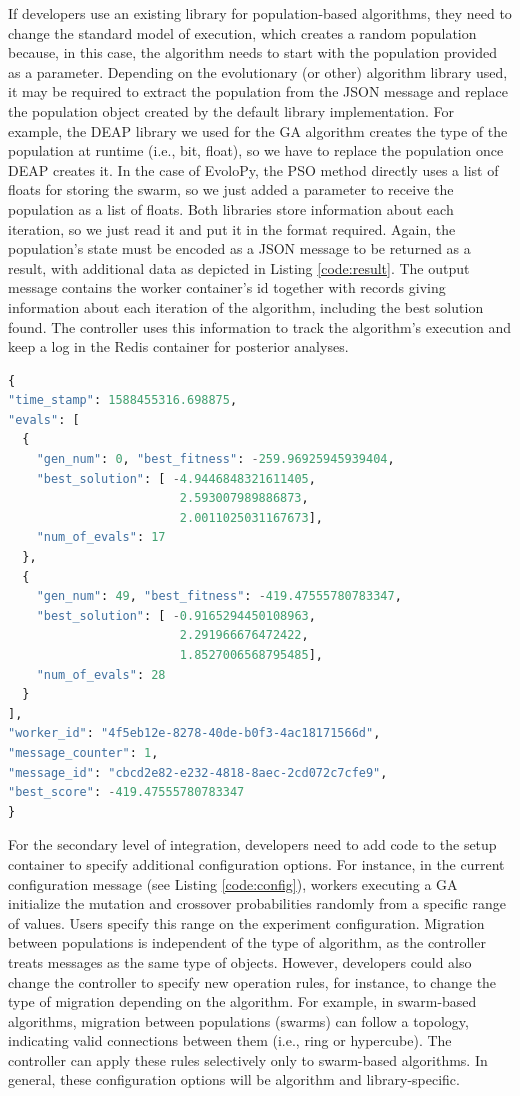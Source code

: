 \documentclass[review]{elsarticle}
\begin{document}
If developers use an existing library for population-based algorithms, they need
to change the standard model of execution, which creates a random
population because, in this case, the algorithm needs to start with the
population provided as a parameter. Depending on the evolutionary (or other) algorithm library used,
it may be required to extract the population from the
JSON message and replace the population object created by the default library implementation. For
example, the DEAP library we used for the GA algorithm creates the type of the
population at runtime (i.e., bit, float), so we have to replace the population
once DEAP creates it. In the case of EvoloPy, the PSO method directly uses a
list of floats for storing the swarm, so we just added a parameter to receive
the population as a list of floats. Both libraries store information about each
iteration, so we just read it and put it in the format required.
Again, the population's state must be encoded as a JSON message to be
returned as a result, with additional data as
depicted in Listing \ref{code:result}. The output message contains the
worker container's id 
together with records giving information about each iteration
of the algorithm, including the best solution found. The controller uses 
this information to track the algorithm's execution and keep a 
log in the Redis container for posterior analyses.

\begin{lstlisting}[language=Python, caption=Fragment of an output message, label=code:result ]
{
"time_stamp": 1588455316.698875,
"evals": [
  {
    "gen_num": 0, "best_fitness": -259.96925945939404,
    "best_solution": [ -4.9446848321611405, 
                        2.593007989886873, 
                        2.0011025031167673],
    "num_of_evals": 17
  },
  {
    "gen_num": 49, "best_fitness": -419.47555780783347,
    "best_solution": [ -0.9165294450108963, 
                        2.291966676472422, 
                        1.8527006568795485],
    "num_of_evals": 28
  }
],
"worker_id": "4f5eb12e-8278-40de-b0f3-4ac18171566d",
"message_counter": 1,
"message_id": "cbcd2e82-e232-4818-8aec-2cd072c7cfe9",
"best_score": -419.47555780783347
}
\end{lstlisting}

For the secondary level of integration, developers need to add code to the setup
container to specify additional configuration options. For instance,
in the current configuration message (see Listing \ref{code:config}),
workers executing a GA initialize the mutation and crossover 
probabilities randomly from a specific range of values. Users specify
this range on the experiment configuration. 
Migration between populations is independent of the type of algorithm, as the
controller treats messages as the same type of objects. However, developers could
also change the controller to specify new operation rules, for instance, to
change the type of migration depending on the algorithm. 
For example, in swarm-based algorithms,  migration between  
populations (swarms) can follow a topology, indicating valid connections 
between them (i.e., ring or hypercube). The controller
can apply these rules selectively only to swarm-based algorithms. 
In general, these configuration options will be algorithm and library-specific. 
\end{document}
